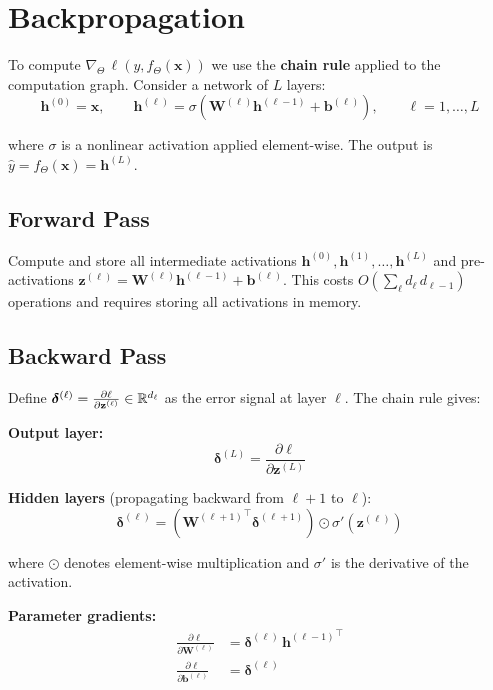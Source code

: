 \documentclass[main.tex]{subfiles}
\begin{document}
\needspace{0.33\textheight}
\section{Backpropagation}

To compute $\nabla_\Theta\,\ell(y, f_\Theta(\mathbf{x}))$ we use the \textbf{chain rule} applied to the computation graph. Consider a network of $L$ layers:
$$\mathbf{h}^{(0)} = \mathbf{x}, \qquad \mathbf{h}^{(\ell)} = \sigma\!\left(\mathbf{W}^{(\ell)}\mathbf{h}^{(\ell-1)} + \mathbf{b}^{(\ell)}\right), \qquad \ell = 1, \ldots, L$$

where $\sigma$ is a nonlinear activation applied element-wise. The output is $\hat{y} = f_\Theta(\mathbf{x}) = \mathbf{h}^{(L)}$.

\subsection{Forward Pass}

Compute and store all intermediate activations $\mathbf{h}^{(0)}, \mathbf{h}^{(1)}, \ldots, \mathbf{h}^{(L)}$ and pre-activations $\mathbf{z}^{(\ell)} = \mathbf{W}^{(\ell)}\mathbf{h}^{(\ell-1)} + \mathbf{b}^{(\ell)}$. This costs $O(\sum_\ell d_\ell\,d_{\ell-1})$ operations and requires storing all activations in memory.

\subsection{Backward Pass}

Define $\boldsymbol{\delta}^{(\ell)} = \frac{\partial \ell}{\partial \mathbf{z}^{(\ell)}} \in \mathbb{R}^{d_\ell}$ as the error signal at layer $\ell$. The chain rule gives:

\textbf{Output layer:}
$$\boldsymbol{\delta}^{(L)} = \frac{\partial \ell}{\partial \mathbf{z}^{(L)}}$$

\textbf{Hidden layers} (propagating backward from $\ell+1$ to $\ell$):
$$\boldsymbol{\delta}^{(\ell)} = \left({\mathbf{W}^{(\ell+1)}}^\top \boldsymbol{\delta}^{(\ell+1)}\right) \odot \sigma'(\mathbf{z}^{(\ell)})$$

where $\odot$ denotes element-wise multiplication and $\sigma'$ is the derivative of the activation.

\textbf{Parameter gradients:}
\begin{align}
\frac{\partial \ell}{\partial \mathbf{W}^{(\ell)}} &= \boldsymbol{\delta}^{(\ell)}\,{\mathbf{h}^{(\ell-1)}}^\top \\[6pt]
\frac{\partial \ell}{\partial \mathbf{b}^{(\ell)}} &= \boldsymbol{\delta}^{(\ell)}
\end{align}
\end{document}
